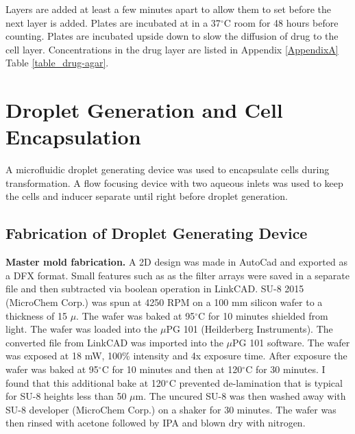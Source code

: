 Layers are added at least a few minutes apart to allow them to set before the next layer is added.
Plates are incubated at in a 37$^{\circ}$C room for 48 hours before counting.
Plates are incubated upside down to slow the diffusion of drug to the cell layer.
Concentrations in the drug layer are listed in Appendix \ref{AppendixA} Table \ref{table_drug-agar}.

\section{Droplet Generation and Cell Encapsulation}

A microfluidic droplet generating device was used to encapsulate cells during transformation.
A flow focusing device with two aqueous inlets was used to keep the cells and inducer separate until right before droplet generation.

\subsection{Fabrication of Droplet Generating Device}

\textbf{Master mold fabrication.} A 2D design was made in AutoCad and exported as a DFX format.
Small features such as as the filter arrays were saved in a separate file and then subtracted via boolean operation in LinkCAD.
SU-8 2015 (MicroChem Corp.) was spun at 4250 RPM on a 100 mm silicon wafer to a thickness of 15 $\mu$.
The wafer was baked at 95$^{\circ}$C for 10 minutes shielded from light.
The wafer was loaded into the $\mu$PG 101 (Heilderberg Instruments).
The converted file from LinkCAD was imported into the $\mu$PG 101 software.
The wafer was exposed at 18 mW, 100\% intensity and 4x exposure time.
After exposure the wafer was baked at 95$^{\circ}$C for 10 minutes and then at 120$^{\circ}$C for 30 minutes.
I found that this additional bake at 120$^{\circ}$C prevented de-lamination that is typical for SU-8 heights less than 50 $\mu$m.
The uncured SU-8 was then washed away with SU-8 developer (MicroChem Corp.) on a shaker for 30 minutes.
The wafer was then rinsed with acetone followed by IPA and blown dry with nitrogen.

